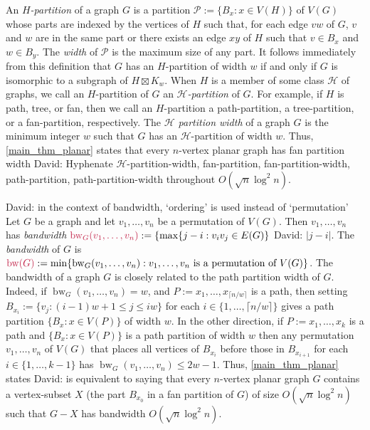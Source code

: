 \documentclass{patmorin}
\makeatletter
\renewcommand{\le}{\leqslant}
\newcommand{\david}[1]{{\color{orange} David: #1}}
\newcommand{\defin}[1]{\emph{\textcolor{brightmaroon}{#1}}}
\def\mathcolor#1#{\@mathcolor{#1}}
\def\@mathcolor#1#2#3{%
  \protect\leavevmode
  \begingroup
    \color#1{#2}#3%
  \endgroup
}
\newcommand{\mathdefin}[1]{\mathcolor{brightmaroon}{#1}}
\DeclareMathOperator{\bw}{bw}
\makeatother
\begin{document}
An \defin{$H$-partition} of a graph $G$ is a partition $\mathcal{P}:=\{B_x: x\in V(H)\}$ of $V(G)$ whose parts are indexed by the vertices of $H$ such that, for each edge $vw$ of $G$, $v$ and $w$ are in the same part or there exists an edge $xy$ of $H$ such that $v\in B_x$ and $w\in B_y$.  The \defin{width} of $\mathcal{P}$ is the maximum size of any part.  It follows immediately from this definition that $G$ has an $H$-partition of width $w$ if and only if $G$ is isomorphic to a subgraph of $H\boxtimes K_w$. When $H$ is a member of some class $\mathcal{H}$ of graphs, we call an $H$-partition of $G$ an \defin{$\mathcal{H}$-partition} of $G$.  For example, if $H$ is path, tree, or fan, then we call an $H$-partition a path-partition, a tree-partition, or a fan-partition, respectively.  The \defin{$\mathcal{H}$ partition width}  of a graph $G$ is the minimum integer $w$ such that $G$ has an $\mathcal{H}$-partition of width $w$. Thus, \cref{main_thm_planar} states that every $n$-vertex planar graph has fan partition width
\david{Hyphenate $\mathcal{H}$-partition-width, fan-partition, fan-partition-width, path-partition, path-partition-width throughout}
$O(\sqrt{n}\log^2 n)$.

\david{in the context of bandwidth, `ordering' is used instead of `permutation'}
Let $G$ be a graph and let $v_1,\ldots,v_n$ be a permutation of $V(G)$.  Then $v_1,\ldots,v_n$ has \defin{bandwidth} $\mathdefin{\bw_G(v_1,\ldots,v_n)}:=\{\max\{j-i: v_iv_j\in E(G)\}$
\david{$|j-i|$}.  The \defin{bandwidth} of $G$ is $\mathdefin{\bw(G)}:=\min\{\bw_G(v_1,\ldots,v_n):\text{$v_1,\ldots,v_n$ is a permutation of $V(G)$}\}$. The bandwidth of a graph $G$ is closely related to the path partition width of $G$.  Indeed, if $\bw_G(v_1,\ldots,v_n)=w$, and $P:=x_1,\ldots,x_{\lceil n/w\rceil}$ is a path, then setting $B_{x_i}:=\{v_j: (i-1)w+1 \le j \le iw\}$ for each $i\in\{1,\ldots,\lceil n/w\rceil\}$ gives a path partition $\{B_{x}:x\in V(P)\}$ of width $w$.  In the other direction, if $P:=x_1,\ldots,x_k$ is a path and  $\{B_x:x\in V(P)\}$ is a path partition of width $w$ then any permutation $v_1,\ldots,v_n$ of $V(G)$ that places all vertices of $B_{x_i}$ before those in $B_{x_{i+1}}$ for each $i\in\{1,\ldots,k-1\}$ has $\bw_G(v_1,\ldots,v_n)\le 2w-1$.  Thus, \cref{main_thm_planar} states \david{is equivalent to saying} that every $n$-vertex planar graph $G$ contains a vertex-subset $X$ (the part $B_{x_0}$ in a fan partition of $G$) of size $O(\sqrt{n}\log^2 n)$ such that $G-X$ has bandwidth $O(\sqrt{n}\log^2 n)$.
\end{document}
